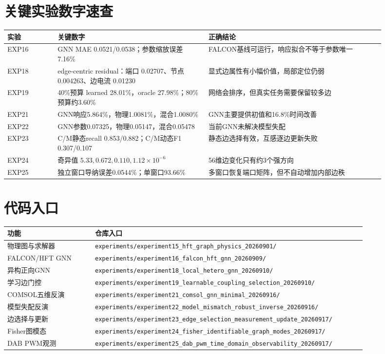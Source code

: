 \documentclass[UTF8,11pt,a4paper]{ctexart}
\newcommand{\code}[1]{\texttt{#1}}
\begin{document}
\appendix
\section{关键实验数字速查}
\begin{longtable}{p{0.12\linewidth}p{0.36\linewidth}p{0.42\linewidth}}
\toprule
实验 & 关键数字 & 正确结论\\
\midrule
EXP16 & GNN MAE 0.0521/0.0538；参数缩放误差 7.16\% & FALCON基线可运行，响应拟合不等于参数唯一\\
EXP18 & edge-centric residual：端口 0.02707、节点 0.004263、边电流 0.01230 & 显式边属性有小幅价值，局部定位仍弱\\
EXP19 & 40\%预算 learned 28.01\%，oracle 27.98\%；80\%预算约3.60\% & 网络会排序，但真实任务需要保留较多边\\
EXP21 & GNN响应5.864\%，物理1.0081\%，混合1.0080\% & GNN主要提供初值和16.8\%时间改善\\
EXP22 & GNN参数0.07325，物理0.05147，混合0.05478 & 当前GNN未解决模型失配\\
EXP23 & C/M静态recall 0.853/0.882；C/M动态F1 0.307/0.107 & 静态边选择有效，互感逐边更新失败\\
EXP24 & 奇异值 $5.33,0.672,0.110,1.12\times10^{-6}$ & 56维边变化只有约3个强方向\\
EXP25 & 独立窗口导纳误差0.0544\%；单窗口93.66\% & 多窗口恢复端口矩阵，但不自动增加内部边秩\\
\bottomrule
\end{longtable}

\section{代码入口}
\begin{longtable}{p{0.22\linewidth}p{0.68\linewidth}}
\toprule
功能 & 仓库入口\\
\midrule
物理图与求解器 & \code{experiments/experiment15\_hft\_graph\_physics\_20260901/}\\
FALCON/HFT GNN & \code{experiments/experiment16\_falcon\_hft\_gnn\_20260909/}\\
异构正向GNN & \code{experiments/experiment18\_local\_hetero\_gnn\_20260910/}\\
学习边门控 & \code{experiments/experiment19\_learnable\_coupling\_selection\_20260910/}\\
COMSOL五维反演 & \code{experiments/experiment21\_comsol\_gnn\_minimal\_20260916/}\\
模型失配反演 & \code{experiments/experiment22\_model\_mismatch\_robust\_inverse\_20260916/}\\
边选择与更新 & \code{experiments/experiment23\_edge\_selection\_measurement\_update\_20260917/}\\
Fisher图模态 & \code{experiments/experiment24\_fisher\_identifiable\_graph\_modes\_20260917/}\\
DAB PWM观测 & \code{experiments/experiment25\_dab\_pwm\_time\_domain\_observability\_20260917/}\\
\bottomrule
\end{longtable}
\end{document}

